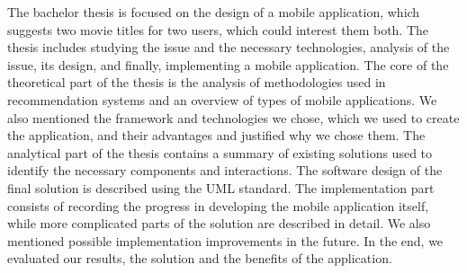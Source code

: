 The bachelor thesis is focused on the design of a mobile application, which suggests two movie titles for two users, which could interest them both. The thesis includes studying the issue and the necessary technologies, analysis of the issue, its design, and finally, implementing a mobile application. The core of the theoretical part of the thesis is the analysis of methodologies used in recommendation systems and an overview of types of mobile applications. We also mentioned the framework and technologies we chose, which we used to create the application, and their advantages and justified why we chose them. The analytical part of the thesis contains a summary of existing solutions used to identify the necessary components and interactions. The software design of the final solution is described using the UML standard. The implementation part consists of recording the progress in developing the mobile application itself, while more complicated parts of the solution are described in detail. We also mentioned possible implementation improvements in the future. In the end, we evaluated our results, the solution and the benefits of the application.